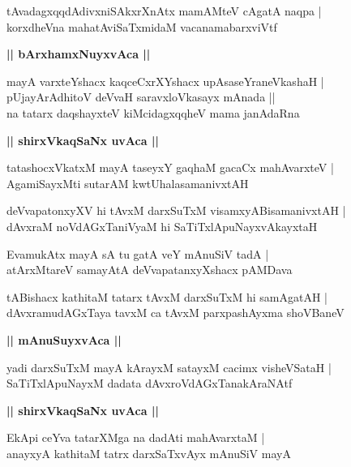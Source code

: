 \documentclass[twoside,12pt,openright]{book}
\newcounter{shloka}[chapter]
\def\uvaca#1{\centerline{{\large\textbf{#1}}}}
\begin{document}
\begin{shloka}%
tAvadagxqqdAdivxniSAkxrXnAtx mamAMteV cAgatA naqpa |\\
korxdheVna mahatAviSaTxmidaM vacanamabarxviVtf
\end{shloka}

\uvaca{|| bArxhamxNuyxvAca ||}

\begin{shloka}%
mayA varxteYshacx kaqceCxrXYshacx upAsaseYraneVkashaH |\\
pUjayArAdhitoV deVvaH saravxloVkasayx mAnada ||\\
na tatarx daqshayxteV kiMcidagxqqheV mama janAdaRna
\end{shloka}

\uvaca{|| shirxVkaqSaNx uvAca ||}

\begin{shloka}%
tatashocxVkatxM mayA taseyxY gaqhaM gacaCx mahAvarxteV |\\
AgamiSayxMti sutarAM kwtUhalasamanivxtAH 
\end{shloka}

\begin{shloka}%
deVvapatonxyXV hi tAvxM darxSuTxM visamxyABisamanivxtAH |\\
dAvxraM noVdAGxTaniVyaM hi SaTiTxlApuNayxvAkayxtaH
\end{shloka}

\begin{shloka}%
EvamukAtx mayA sA tu gatA veY mAnuSiV tadA |\\
atArxMtareV samayAtA deVvapatanxyXshacx pAMDava
\end{shloka}

\begin{shloka}%
tABishacx kathitaM tatarx tAvxM darxSuTxM hi samAgatAH |\\
dAvxramudAGxTaya tavxM ca tAvxM parxpashAyxma shoVBaneV
\end{shloka}

\uvaca{|| mAnuSuyxvAca ||}

\begin{shloka}%
yadi darxSuTxM mayA kArayxM satayxM cacimx visheVSataH |\\
SaTiTxlApuNayxM dadata dAvxroVdAGxTanakAraNAtf
\end{shloka}

\uvaca{|| shirxVkaqSaNx uvAca ||}

\begin{shloka}%
EkApi ceYva tatarXMga na dadAti mahAvarxtaM |\\
anayxyA kathitaM tatrx darxSaTxvAyx mAnuSiV mayA
\end{shloka}
\end{document}
